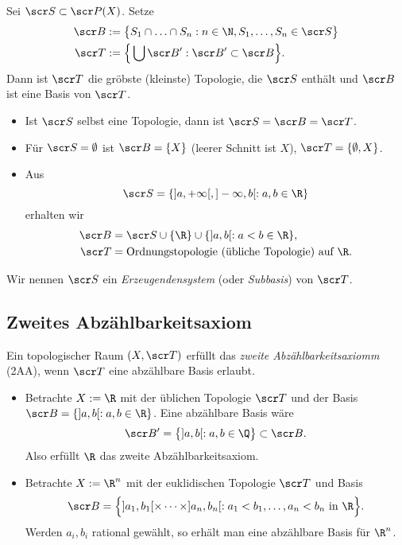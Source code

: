 \begin{st}
	Sei $\scr S \subset \scr P(X)$.
	Setze
	\begin{align*}
		\scr B &:= \big\{ S_1 \cap \dotsc \cap S_n : n \in \N, S_1, \dotsc, S_n \in \scr S \big\} \\
		\scr T &:= \Big\{ \bigcup \scr B' : \scr B' \subset \scr B \Big\}.
	\end{align*}
	Dann ist $\scr T$ die gröbste (kleinste) Topologie, die $\scr S$ enthält und $\scr B$ ist eine Basis von $\scr T$.
\end{st}

\begin{ex}
	\begin{itemize}
		\item
			Ist $\scr S$ selbst eine Topologie, dann ist $\scr S = \scr B = \scr T$.
		\item
			Für $\scr S = \emptyset$ ist $\scr B = \{X\}$ (leerer Schnitt ist $X$), $\scr T = \{\emptyset, X \}$.
		\item
			Aus
			\[
				\scr S = \{ ]a,+\infty[, ]-\infty, b[ : a,b \in \R \}
			\]
			erhalten wir
			\begin{align*}
				\scr B &= \scr S \cup \{\R \}  \cup \{ ]a,b[ : a < b \in \R \}, \\
				\scr T &= \text{Ordnungstopologie (übliche Topologie) auf $\R$}.
			\end{align*}
	\end{itemize}
\end{ex}

\begin{conv}
	Wir nennen $\scr S$ ein \emph{Erzeugendensystem} (oder \emph{Subbasis}) von $\scr T$.
\end{conv}

\subsection{Zweites Abzählbarkeitsaxiom}

\begin{df}
	Ein topologischer Raum $(X, \scr T)$ erfüllt das \emph{zweite Abzählbarkeitsaxiomm} (2AA), wenn $\scr  T$ eine abzählbare Basis erlaubt.
\end{df}

\begin{ex} \label{ex:R_countable_base}
	\begin{itemize}
		\item
			Betrachte $X := \R$ mit der üblichen Topologie $\scr T$ und der Basis $\scr B = \{ ]a,b[ : a,b \in \R \}$.
			Eine abzählbare Basis wäre
			\[
				\scr B' = \big\{ ]a,b[ : a,b \in \Q \big\} \subset \scr B.
			\]
			Also erfüllt $\R$ das zweite Abzählbarkeitsaxiom.
		\item
			Betrachte $X := \R^n$ mit der euklidischen Topologie $\scr T$ und Basis
			\[
				\scr B = \Big\{ ]a_1,b_1[ \times \dotsb \times ]a_n,b_n[ : a_1 < b_1, \dotsc, a_n < b_n \text{ in $\R$} \Big\}.
			\]
			Werden $a_i, b_i$ rational gewählt, so erhält man eine abzählbare Basis für $\R^n$.
	\end{itemize}
\end{ex}

